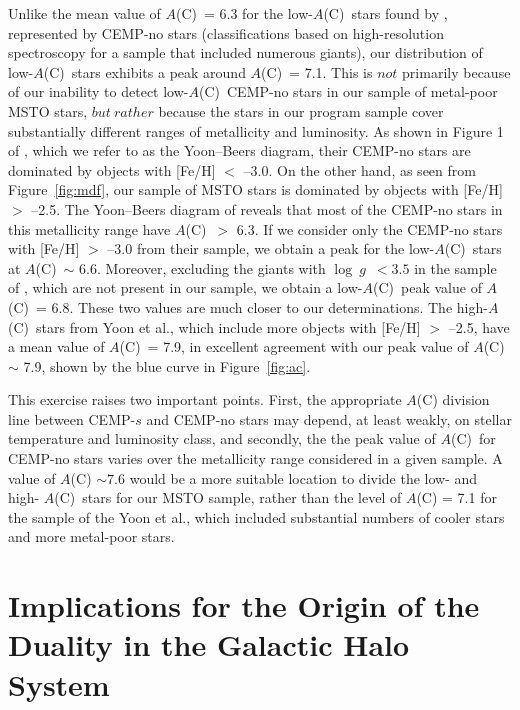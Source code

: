 \documentclass[iop]{emulateapj}
\newcommand*{\ac}{$A$(C)}
\newcommand*{\logg}{$\log~g$}
\begin{document}
Unlike the mean value of \ac\ = 6.3 for the low-\ac\ stars found by
\citet{yoon2016}, represented by CEMP-no stars (classifications
based on high-resolution spectroscopy for a sample that included
numerous giants), our distribution of low-\ac\ stars exhibits a peak
around \ac\ = 7.1. This is $not$ primarily because of our inability to
detect low-\ac\ CEMP-no stars in our sample of metal-poor MSTO stars,
$but~rather$ because the stars in our program sample cover
substantially different ranges of metallicity and luminosity. As shown
in Figure 1 of \citet{yoon2016}, which we refer to as the Yoon--Beers
diagram, their CEMP-no stars are dominated by objects with [Fe/H] $<$
--3.0. On the other hand, as seen from Figure~\ref{fig:mdf}, our sample
of MSTO stars is dominated by objects with [Fe/H] $>$ --2.5. The
Yoon--Beers diagram of \citet{yoon2016} reveals that most of the CEMP-no
stars in this metallicity range have \ac\ $>$ 6.3. If we consider only 
the CEMP-no stars with [Fe/H] $>$ --3.0 from their sample, we obtain a
peak for the low-\ac\ stars at \ac\ $\sim$ 6.6. Moreover, excluding the
giants with \logg\ $< 3.5$ in the sample of \citet{yoon2016}, which are
not present in our sample, we obtain a low-\ac\ peak value of \ac\ = 6.8.
These two values are much closer to our determinations. The high-\ac\
stars from Yoon et al., which include more objects with [Fe/H] $>$
--2.5, have a mean value of \ac\ = 7.9, in excellent agreement with our
peak value of \ac\ $\sim$ 7.9, shown by the blue curve in
Figure~\ref{fig:ac}.

This exercise raises two important points. First, the appropriate $A$(C)
division line between CEMP-$s$ and CEMP-no stars may depend, at least
weakly, on stellar temperature and luminosity class, and secondly, the
the peak value of \ac\ for CEMP-no stars varies over the metallicity
range considered in a given sample. A value of $A$(C) $\sim 7.6$ would be
a more suitable location to divide the low- and high- \ac\ stars for our
MSTO sample, rather than the level of $A$(C) = 7.1 for the sample of 
the Yoon et al., which included substantial numbers of cooler stars and 
more metal-poor stars.


\section{Implications for the Origin of the Duality in the Galactic Halo System}
\end{document}

